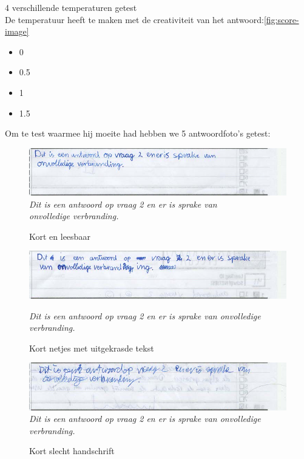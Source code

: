 \documentclass[12pt]{article}
\begin{document}
\begin{multicols}{2}
\noindent\begin{minipage}{\textwidth}
4 verschillende temperaturen getest \\
De temperatuur heeft te maken met de creativiteit van het antwoord:\ref{fig:score-image}
\begin{itemize}
    \item 0
    \item 0.5
    \item 1
    \item 1.5
\end{itemize}
\end{minipage}
Om te test waarmee hij moeite had hebben we 5 antwoordfoto's getest:
\begin{figure}[H]
    \centering
    \includegraphics[width=1\linewidth]{./images/methoden/inscannen/tekst/kort_leesbaar.png}
    \textit{Dit is een antwoord op vraag 2 en er is sprake van\\
onvolledige verbranding.}
    \caption{Kort en leesbaar}
    \label{fig:img-short-readable}
\end{figure}
\begin{figure}[H]
    \centering
    \includegraphics[width=1\linewidth]{./images/methoden/inscannen/tekst/kort_leesbaar_uitgekrast.png}

    \textit{Dit is een antwoord op vraag 2 en er is sprake van onvolledige verbranding.}
    \caption{Kort netjes met uitgekrasde tekst}

    \label{fig:img-short-crossed}
\end{figure}
\begin{figure}[H]
    \centering
    \includegraphics[width=1\linewidth]{./images/methoden/inscannen/tekst/kort_onleesbaar.png}
    \textit{Dit is een antwoord op vraag 2 en er is sprake van onvolledige verbranding.}
    \caption{Kort slecht handschrift}


\end{figure}
\end{multicols}
\end{document}
